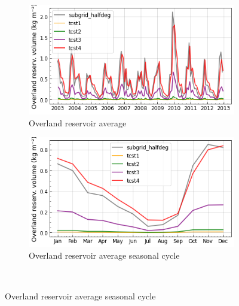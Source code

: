\begin{figure}[htbp]
    \begin{subfigure}[b]{0.48\textwidth}
        \caption{Overland reservoir average}
        \includegraphics[width=\textwidth]{images/chap3/time_series/fastr_time_series_tcsts.png}
    \end{subfigure}
    \begin{subfigure}[b]{0.48\textwidth}
        \caption{Overland reservoir average seasonal cycle}
        \includegraphics[width=\textwidth]{images/chap3/time_series/fastr_seasonal_cycle_tcsts.png}
    \end{subfigure} \\
    

\end{figure}
